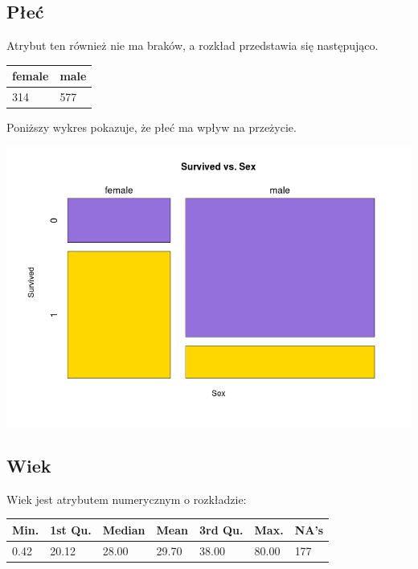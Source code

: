 \documentclass{article}
\begin{document}
\subsection{Płeć}

Atrybut ten również nie ma braków, a rozkład przedstawia się następująco.
\begin{center}
    \begin{tabular}{| l | l |}
    \hline
	female &  male \\ \hline
	314  &  577 \\
    \hline
    \end{tabular}
\end{center}

Poniższy wykres pokazuje, że płeć ma wpływ na przeżycie.
\begin{center}
	\includegraphics[scale=0.40]{images/survived-vs-sex.png}
\end{center}

\subsection{Wiek}

Wiek jest atrybutem numerycznym o rozkładzie:
\begin{center}
    \begin{tabular}{| l | l | l | l | l | l | l |}
    \hline
Min. & 1st Qu. & Median   & Mean & 3rd Qu.  &  Max.  &  NA's  \\ \hline
0.42  & 20.12  & 28.00  & 29.70 &  38.00  & 80.00   &  177 \\
    \hline
    \end{tabular}
\end{center}
\end{document}
